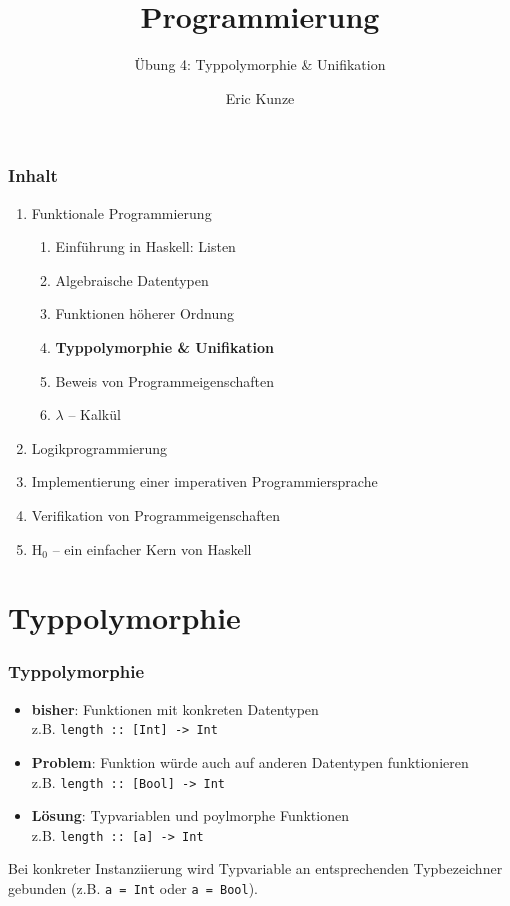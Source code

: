 \documentclass{beamer}
\begin{document}
	
	\title{Programmierung}
	\subtitle{Übung 4: Typpolymorphie \& Unifikation}
	\author{Eric Kunze}
	\date{}
	
	\maketitle
	


\begin{frame}[fragile] \frametitle{Inhalt}
	\begin{enumerate}
		\item Funktionale Programmierung
		\begin{enumerate}
			\item Einführung in Haskell: Listen
			\item Algebraische Datentypen
			\item Funktionen höherer Ordnung
			\item \textbf{Typpolymorphie \& Unifikation}
			\item Beweis von Programmeigenschaften
			\item $\lambda$ -- Kalkül
		\end{enumerate}
		\item Logikprogrammierung
		\item Implementierung einer imperativen Programmiersprache
		\item Verifikation von Programmeigenschaften
		\item H${}_\text{0}$ -- ein einfacher Kern von Haskell
	\end{enumerate}
\end{frame}

\section{Typpolymorphie}

\begin{frame}[fragile, t] \frametitle{Typpolymorphie}
	\begin{itemize}
		\item \textbf{bisher}: Funktionen mit konkreten Datentypen \\
		z.B. \texttt{length :: [Int] -> Int}
		\item \textbf{Problem}: Funktion würde auch auf anderen Datentypen funktionieren \\
		z.B. \texttt{length :: [Bool] -> Int}
		\item \textbf{Lösung}: Typvariablen und poylmorphe Funktionen \\
		z.B. \texttt{length :: [a] -> Int}
	\end{itemize}

	Bei konkreter Instanziierung wird Typvariable an entsprechenden Typbezeichner gebunden (z.B. \texttt{a = Int} oder \texttt{a = Bool}).
\end{frame}
\end{document}
